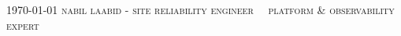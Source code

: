 \documentclass[localFont,alternative,10pt,compact]{yaac-another-awesome-cv}
\begin{document}
	\makecvheader

	\makecvfooter
		{\textsc{\today}} %
		{\textsc{nabil laabid - site reliability engineer \ \textbar \ platform \& observability expert}}
		{\thepage}

	

\end{document}
